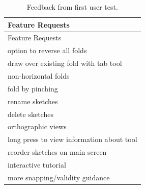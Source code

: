 \begin{longtable}[c]{@{}l@{}}
\caption{Feedback from first user test.}\tabularnewline
\toprule
\begin{minipage}[b]{0.82\columnwidth}\raggedright\strut
Feature Requests
\strut\end{minipage}\tabularnewline
\midrule
\endfirsthead
\toprule
\begin{minipage}[b]{0.82\columnwidth}\raggedright\strut
Feature Requests
\strut\end{minipage}\tabularnewline
\midrule
\endhead
\begin{minipage}[t]{0.82\columnwidth}\raggedright\strut
option to reverse all folds
\strut\end{minipage}\tabularnewline
\begin{minipage}[t]{0.82\columnwidth}\raggedright\strut
draw over existing fold with tab tool
\strut\end{minipage}\tabularnewline
\begin{minipage}[t]{0.82\columnwidth}\raggedright\strut
non-horizontal folds
\strut\end{minipage}\tabularnewline
\begin{minipage}[t]{0.82\columnwidth}\raggedright\strut
fold by pinching
\strut\end{minipage}\tabularnewline
\begin{minipage}[t]{0.82\columnwidth}\raggedright\strut
rename sketches
\strut\end{minipage}\tabularnewline
\begin{minipage}[t]{0.82\columnwidth}\raggedright\strut
delete sketches
\strut\end{minipage}\tabularnewline
\begin{minipage}[t]{0.82\columnwidth}\raggedright\strut
orthographic views
\strut\end{minipage}\tabularnewline
\begin{minipage}[t]{0.82\columnwidth}\raggedright\strut
long press to view information about tool
\strut\end{minipage}\tabularnewline
\begin{minipage}[t]{0.82\columnwidth}\raggedright\strut
reorder sketches on main screen
\strut\end{minipage}\tabularnewline
\begin{minipage}[t]{0.82\columnwidth}\raggedright\strut
interactive tutorial
\strut\end{minipage}\tabularnewline
\begin{minipage}[t]{0.82\columnwidth}\raggedright\strut
more snapping/validity guidance
\strut\end{minipage}\tabularnewline
\bottomrule
\end{longtable}

